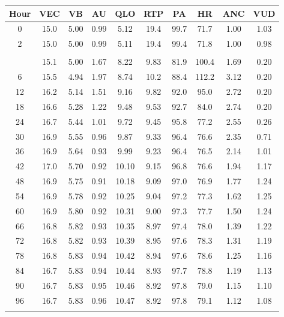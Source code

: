 \begin{table}
  \centering
  \begin{tabular}{cccccccccc}
    \toprule
    Hour & VEC & VB & AU & QLO & RTP & PA & HR & ANC & VUD \\
    \midrule
    0 & 15.0 & 5.00 & 0.99 & 5.12 & 19.4 & 99.7 & 71.7 & 1.00 & 1.03 \\
    2 & 15.0 & 5.00 & 0.99 & 5.11 & 19.4 & 99.4 & 71.8 & 1.00 & 0.98 \\
    \addlinespace[\paramchangeskip]
    \multicolumn{10}{c}{\textit{FIS = 0.05}} \\
    \addlinespace[\paramchangeskip]
    3 & 15.1 & 5.00 & 1.67 & 8.22 & 9.83 & 81.9 & 100.4 & 1.69 & 0.20 \\
    6 & 15.5 & 4.94 & 1.97 & 8.74 & 10.2 & 88.4 & 112.2 & 3.12 & 0.20 \\
    12 & 16.2 & 5.14 & 1.51 & 9.16 & 9.82 & 92.0 & 95.0 & 2.72 & 0.20 \\
    18 & 16.6 & 5.28 & 1.22 & 9.48 & 9.53 & 92.7 & 84.0 & 2.74 & 0.20 \\
    24 & 16.7 & 5.44 & 1.01 & 9.72 & 9.45 & 95.8 & 77.2 & 2.55 & 0.26 \\
    30 & 16.9 & 5.55 & 0.96 & 9.87 & 9.33 & 96.4 & 76.6 & 2.35 & 0.71 \\
    36 & 16.9 & 5.64 & 0.93 & 9.99 & 9.23 & 96.4 & 76.5 & 2.14 & 1.01 \\
    42 & 17.0 & 5.70 & 0.92 & 10.10 & 9.15 & 96.8 & 76.6 & 1.94 & 1.17 \\
    48 & 16.9 & 5.75 & 0.91 & 10.18 & 9.09 & 97.0 & 76.9 & 1.77 & 1.24 \\
    54 & 16.9 & 5.78 & 0.92 & 10.25 & 9.04 & 97.2 & 77.3 & 1.62 & 1.25 \\
    60 & 16.9 & 5.80 & 0.92 & 10.31 & 9.00 & 97.3 & 77.7 & 1.50 & 1.24 \\
    66 & 16.8 & 5.82 & 0.93 & 10.35 & 8.97 & 97.4 & 78.0 & 1.39 & 1.22 \\
    72 & 16.8 & 5.82 & 0.93 & 10.39 & 8.95 & 97.6 & 78.3 & 1.31 & 1.19 \\
    78 & 16.8 & 5.83 & 0.94 & 10.42 & 8.94 & 97.6 & 78.6 & 1.25 & 1.16 \\
    84 & 16.7 & 5.83 & 0.94 & 10.44 & 8.93 & 97.7 & 78.8 & 1.19 & 1.13 \\
    90 & 16.7 & 5.83 & 0.95 & 10.46 & 8.92 & 97.8 & 79.0 & 1.15 & 1.10 \\
    96 & 16.7 & 5.83 & 0.96 & 10.47 & 8.92 & 97.8 & 79.1 & 1.12 & 1.08 \\
    \addlinespace[\paramchangeskip]

\end{tabular}
\end{table}
